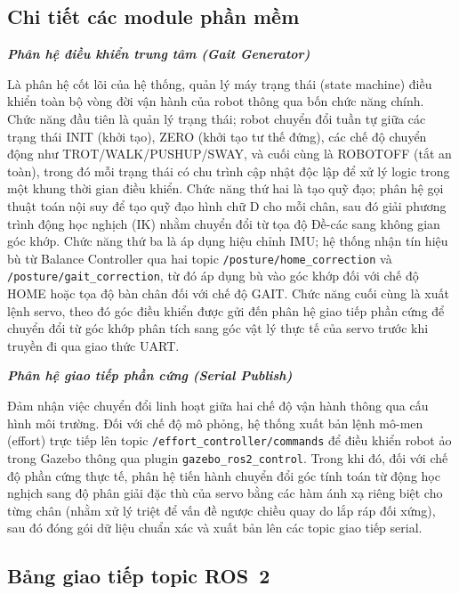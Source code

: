 \subsection{Chi tiết các module phần mềm}

\textbf{\textit{Phân hệ điều khiển trung tâm (Gait Generator)}} 

Là phân hệ cốt lõi của hệ thống, quản lý máy trạng thái (state machine) điều khiển toàn bộ vòng đời vận hành của robot thông qua bốn chức năng chính. Chức năng đầu tiên là quản lý trạng thái; robot chuyển đổi tuần tự giữa các trạng thái INIT (khởi tạo), ZERO (khởi tạo tư thế đứng), các chế độ chuyển động như TROT/WALK/PUSHUP/SWAY, và cuối cùng là ROBOTOFF (tắt an toàn), trong đó mỗi trạng thái có chu trình cập nhật độc lập để xử lý logic trong một khung thời gian điều khiển. Chức năng thứ hai là tạo quỹ đạo; phân hệ gọi thuật toán nội suy để tạo quỹ đạo hình chữ D cho mỗi chân, sau đó giải phương trình động học nghịch (IK) nhằm chuyển đổi từ tọa độ Đề-các sang không gian góc khớp. Chức năng thứ ba là áp dụng hiệu chỉnh IMU; hệ thống nhận tín hiệu bù từ Balance Controller qua hai topic \texttt{/posture/}\allowbreak\texttt{home\_correction} và \texttt{/posture/}\allowbreak\texttt{gait\_correction}, từ đó áp dụng bù vào góc khớp đối với chế độ HOME hoặc tọa độ bàn chân đối với chế độ GAIT. Chức năng cuối cùng là xuất lệnh servo, theo đó góc điều khiển được gửi đến phân hệ giao tiếp phần cứng để chuyển đổi từ góc khớp phân tích sang góc vật lý thực tế của servo trước khi truyền đi qua giao thức UART.

\textbf{\textit{Phân hệ giao tiếp phần cứng (Serial Publish)}} 

Đảm nhận việc chuyển đổi linh hoạt giữa hai chế độ vận hành thông qua cấu hình môi trường. Đối với chế độ mô phỏng, hệ thống xuất bản lệnh mô-men (effort) trực tiếp lên topic \texttt{/effort\_controller/commands} để điều khiển robot ảo trong Gazebo thông qua plugin \texttt{gazebo\_ros2\_control}. Trong khi đó, đối với chế độ phần cứng thực tế, phân hệ tiến hành chuyển đổi góc tính toán từ động học nghịch sang độ phân giải đặc thù của servo bằng các hàm ánh xạ riêng biệt cho từng chân (nhằm xử lý triệt để vấn đề ngược chiều quay do lắp ráp đối xứng), sau đó đóng gói dữ liệu chuẩn xác và xuất bản lên các topic giao tiếp serial.

\subsection{Bảng giao tiếp topic ROS~2}

